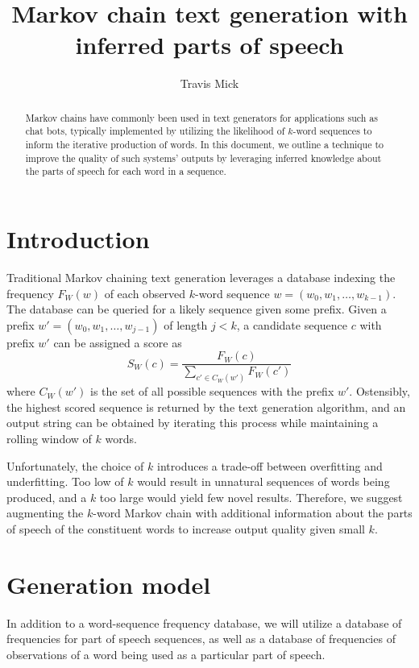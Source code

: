 \documentclass[11pt]{article}
\title{\textbf{Markov chain text generation with inferred parts of speech}}
\author{Travis Mick}
\begin{document}
\maketitle

\begin{abstract}
Markov chains have commonly been used in text generators for applications
such as chat bots, typically implemented by utilizing the likelihood of $k$-word
sequences to inform the iterative production of words.
%
In this document, we outline a technique to improve the quality of such systems'
outputs by leveraging inferred knowledge about the parts of speech for each
word in a sequence.
%
\end{abstract}

\section{Introduction}

Traditional Markov chaining text generation leverages a database indexing the
frequency $F_W(w)$ of each observed $k$-word sequence $w = (w_0, w_1, \dots, w_{k-1})$.
%
The database can be queried for a likely sequence given some prefix.
%
Given a prefix $w' = (w_0, w_1, \dots, w_{j-1})$ of length $j < k$, a candidate
sequence $c$ with prefix $w'$ can be assigned a score as
%
\begin{equation}
\label{eqn:wordscore}
S_W(c) = \frac{F_W(c)}{\sum_{c' \in C_W(w')} F_W(c')}
\end{equation}
where $C_W(w')$ is the set of all possible sequences with the prefix $w'$.
%
Ostensibly, the highest scored sequence is returned by the text generation algorithm,
and an output string can be obtained by iterating this process while maintaining a
rolling window of $k$ words.
%

Unfortunately, the choice of $k$ introduces a trade-off between overfitting and underfitting.
%
Too low of $k$ would result in unnatural sequences of words being produced, and a $k$ too large
would yield few novel results.
%
Therefore, we suggest augmenting the $k$-word Markov chain with additional information about
the parts of speech of the constituent words to increase output quality given small $k$.
%

\section{Generation model}

In addition to a word-sequence frequency database, we will utilize a database of frequencies for
part of speech sequences, as well as a database of frequencies of observations of a word being
used as a particular part of speech.
%
\end{document}
